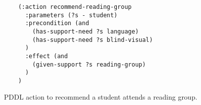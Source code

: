 \begin{figure}[t]
    \begin{lstlisting}
    (:action recommend-reading-group
      :parameters (?s - student)
      :precondition (and 
        (has-support-need ?s language)
        (has-support-need ?s blind-visual)
      )
      :effect (and 
        (given-support ?s reading-group)
      )
    )
    \end{lstlisting}
    \caption{PDDL action to recommend a student attends a reading group.}\label{fig:reading-group}
\end{figure}
